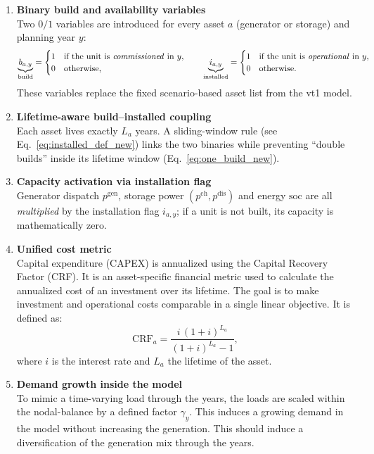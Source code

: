 \begin{enumerate}[label=\textbf{\roman*.}]
    \item \textbf{Binary build and availability variables}\\ 
          Two $0/1$ variables are introduced for every asset $a$ (generator or storage) and planning year $y$:
          \[
             \underbrace{b_{a,y}}_{\text{build}} = 
             \begin{cases}1 &\text{if the unit is \emph{commissioned} in }y,
                \\0&\text{otherwise,}\end{cases}
             \qquad
             \underbrace{i_{a,y}}_{\text{installed}} = 
             \begin{cases}1 &\text{if the unit is \emph{operational} in }y,
                \\0&\text{otherwise.}\end{cases}
          \]
          These variables replace the fixed scenario-based asset list from the vt1 model.

    \item \textbf{Lifetime-aware build–installed coupling}\\  
          Each asset lives exactly $L_a$ years.  
          A sliding-window rule (see Eq.~\eqref{eq:installed_def_new}) links the two binaries 
          while preventing “double builds” inside its lifetime window 
          (Eq.~\eqref{eq:one_build_new}).

    \item \textbf{Capacity activation via installation flag}\\  
          Generator dispatch $p^{\mathrm{gen}}$, storage power $(p^{\mathrm{ch}},
          p^{\mathrm{dis}})$ and energy $\mathrm{soc}$ are all \emph{multiplied} by the installation flag $i_{a,y}$; if a unit is not built, its capacity is mathematically zero.

    \item \textbf{Unified cost metric}\\  
          Capital expenditure (CAPEX) is annualized using the Capital Recovery Factor (CRF).  It is an asset-specific financial metric used to calculate the annualized cost of an investment over its lifetime.
          The goal is to make investment and operational costs comparable in a single linear objective. It is defined as:
          \begin{equation}
            \mathrm{CRF}_a = \frac{i\,(1+i)^{L_a}}{(1+i)^{L_a}-1},
          \end{equation}
          where $i$ is the interest rate and $L_a$ the lifetime of the asset.

    \item \textbf{Demand growth inside the model}\\  
          To mimic a time-varying load through the years, the loads are scaled within the nodal-balance by a defined 
          factor $\gamma_y$. This induces a growing demand in the model without increasing the generation. 
          This should induce a diversification of the generation mix through the years.

\end{enumerate}

